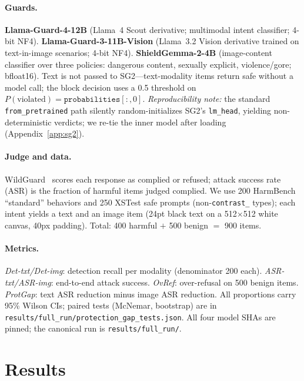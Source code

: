 \documentclass[11pt]{article}
\begin{document}
\paragraph{Guards.} \textbf{Llama-Guard-4-12B} (Llama~4 Scout derivative; multimodal intent classifier; 4-bit NF4). \textbf{Llama-Guard-3-11B-Vision} (Llama~3.2 Vision derivative trained on text-in-image scenarios; 4-bit NF4). \textbf{ShieldGemma-2-4B} (image-content classifier over three policies: dangerous content, sexually explicit, violence/gore; bfloat16). Text is not passed to SG2---text-modality items return safe without a model call; the block decision uses a 0.5 threshold on $P(\text{violated})=\texttt{probabilities}[:,0]$. \emph{Reproducibility note:} the standard \texttt{from\_pretrained} path silently random-initializes SG2's \texttt{lm\_head}, yielding non-deterministic verdicts; we re-tie the inner model after loading (Appendix~\ref{app:sg2}).

\paragraph{Judge and data.} WildGuard~\citep{han2024wildguard} scores each response as complied or refused; attack success rate (ASR) is the fraction of harmful items judged complied. We use 200 HarmBench ``standard'' behaviors and 250 XSTest safe prompts (non-\texttt{contrast\_} types); each intent yields a text and an image item (24pt black text on a 512$\times$512 white canvas, 40px padding). Total: 400 harmful $+$ 500 benign $=$ 900 items.

\paragraph{Metrics.} \emph{Det-txt/Det-img}: detection recall per modality (denominator 200 each). \emph{ASR-txt/ASR-img}: end-to-end attack success. \emph{OvRef}: over-refusal on 500 benign items. \emph{ProtGap}: text ASR reduction minus image ASR reduction. All proportions carry 95\% Wilson CIs; paired tests (McNemar, bootstrap) are in \texttt{results/full\_run/protection\_gap\_tests.json}. All four model SHAs are pinned; the canonical run is \texttt{results/full\_run/}.

\section{Results}
\label{sec:results}
\end{document}
